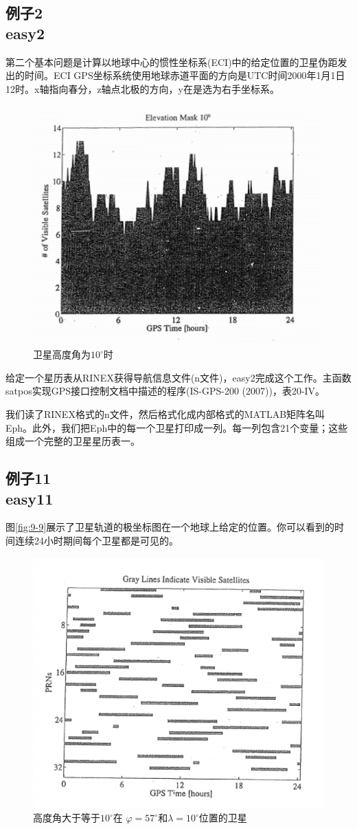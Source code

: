 	\subsection[例子2]{例子2\\easy2}\label{subsec:easy2}
		第二个基本问题是计算以地球中心的惯性坐标系(ECI)中的给定位置的卫星伪距发出的时间。ECI GPS坐标系统使用地球赤道平面的方向是UTC时间2000年1月1日12时。x轴指向春分，z轴点北极的方向，y在是选为右手坐标系。
		\begin{figure}
			\centering
			\includegraphics[width=0.7\linewidth]{TeX_files/Part03/chapter09/image/9-10}
			\caption{卫星高度角为$10^\circ$时}
			\label{fig:9-10}
		\end{figure}
		
		给定一个星历表从RINEX获得导航信息文件(n文件)，easy2完成这个工作。主函数satpos实现GPS接口控制文档中描述的程序(IS-GPS-200 (2007))，表20-IV。
		
		我们读了RINEX格式的n文件，然后格式化成内部格式的MATLAB矩阵名叫Eph。此外，我们把Eph中的每一个卫星打印成一列。每一列包含21个变量；这些组成一个完整的卫星星历表一。
	
	\subsection[例子11]{例子11\\easy11}\label{subsec:easy11}
		图\ref{fig:9-9}展示了卫星轨道的极坐标图在一个地球上给定的位置。你可以看到的时间连续24小时期间每个卫星都是可见的。
		\begin{figure}
			\centering
			\includegraphics[width=0.7\linewidth]{TeX_files/Part03/chapter09/image/9-11}
			\caption{高度角大于等于$10^\circ$在 $\varphi = 57^\circ$和$\lambda = 10^\circ$位置的卫星}
			\label{fig:9-11}
		\end{figure}
		
